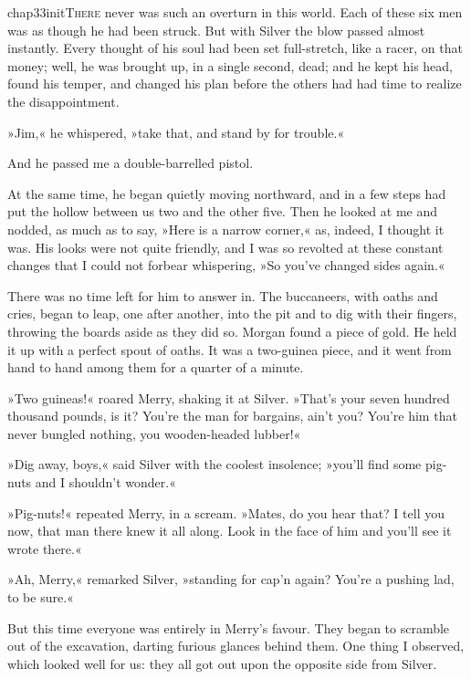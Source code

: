 
\lettrine[lines=5,image=true,findent=2pt]{chap33initT}{here} never was such an overturn in this world. Each of these six men was as though he had been struck. But with Silver the blow passed almost instantly. Every thought of his soul had been set full-stretch, like a racer, on that money; well, he was brought up, in a single second, dead; and he kept his head, found his temper, and changed his plan before the others had had time to realize the disappointment.

»Jim,« he whispered, »take that, and stand by for trouble.«

And he passed me a double-barrelled pistol.

At the same time, he began quietly moving northward, and in a few steps had put the hollow between us two and the other five. Then he looked at me and nodded, as much as to say, »Here is a narrow corner,« as, indeed, I thought it was. His looks were not quite friendly, and I was so revolted at these constant changes that I could not forbear whispering, »So you've changed sides again.«

There was no time left for him to answer in. The buccaneers, with oaths and cries, began to leap, one after another, into the pit and to dig with their fingers, throwing the boards aside as they did so. Morgan found a piece of gold. He held it up with a perfect spout of oaths. It was a two-guinea piece, and it went from hand to hand among them for a quarter of a minute.

»Two guineas!« roared Merry, shaking it at Silver. »That's your seven hundred thousand pounds, is it? You're the man for bargains, ain't you? You're him that never bungled nothing, you wooden-headed lubber!«

»Dig away, boys,« said Silver with the coolest insolence; »you'll find some pig-nuts and I shouldn't wonder.«

»Pig-nuts!« repeated Merry, in a scream. »Mates, do you hear that? I tell you now, that man there knew it all along. Look in the face of him and you'll see it wrote there.«

»Ah, Merry,« remarked Silver, »standing for cap'n again? You're a pushing lad, to be sure.«

But this time everyone was entirely in Merry's favour. They began to scramble out of the excavation, darting furious glances behind them. One thing I observed, which looked well for us: they all got out upon the opposite side from Silver.

